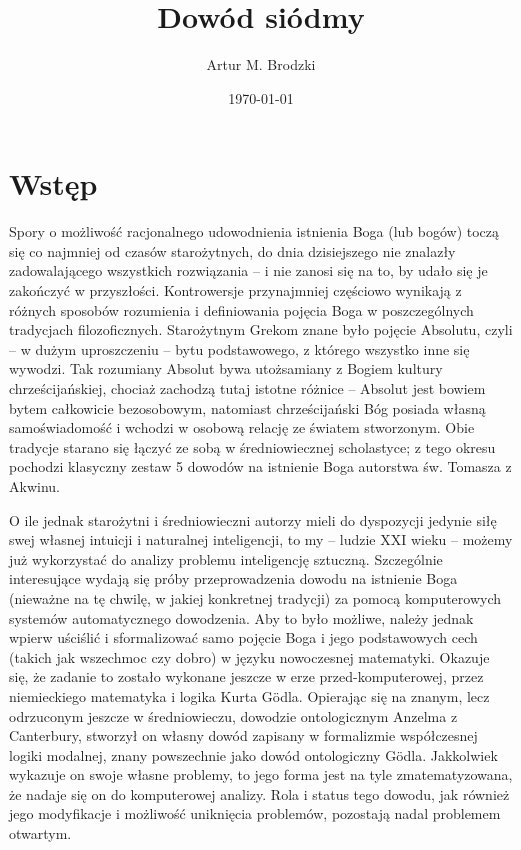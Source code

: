 \documentclass{eiti-raport}
\begin{document}
\author{Artur M. Brodzki}
\date{\today}
\subject{SDM2}
\title{
	Dowód siódmy
}
\maketitle


\section{Wstęp} \label{sec:intro}
Spory o możliwość racjonalnego udowodnienia istnienia Boga (lub bogów) toczą się co najmniej od czasów starożytnych, do dnia dzisiejszego nie znalazły zadowalającego wszystkich rozwiązania -- i nie zanosi się na to, by udało się je zakończyć w przyszłości. Kontrowersje przynajmniej częściowo wynikają z różnych sposobów rozumienia i definiowania pojęcia Boga w poszczególnych tradycjach filozoficznych. Starożytnym Grekom znane było pojęcie Absolutu, czyli -- w dużym uproszczeniu -- bytu podstawowego, z którego wszystko inne się wywodzi. Tak rozumiany Absolut bywa utożsamiany z Bogiem kultury chrześcijańskiej, chociaż zachodzą tutaj istotne różnice -- Absolut jest bowiem bytem całkowicie bezosobowym, natomiast chrześcijański Bóg posiada własną samoświadomość i wchodzi w osobową relację ze światem stworzonym. Obie tradycje starano się łączyć ze sobą w średniowiecznej scholastyce; z tego okresu pochodzi klasyczny zestaw 5 dowodów na istnienie Boga autorstwa św. Tomasza z Akwinu. 

O ile jednak starożytni i średniowieczni autorzy mieli do dyspozycji jedynie siłę swej własnej intuicji i naturalnej inteligencji, to my -- ludzie XXI wieku -- możemy już wykorzystać do analizy problemu inteligencję sztuczną. Szczególnie interesujące wydają się próby przeprowadzenia dowodu na istnienie Boga (nieważne na tę chwilę, w jakiej konkretnej tradycji) za pomocą komputerowych systemów automatycznego dowodzenia. Aby to było możliwe, należy jednak wpierw uściślić i sformalizować samo pojęcie Boga i jego podstawowych cech (takich jak wszechmoc czy dobro) w języku nowoczesnej matematyki. Okazuje się, że zadanie to zostało wykonane jeszcze w erze przed-komputerowej, przez niemieckiego matematyka i logika Kurta G\"odla. Opierając się na znanym, lecz odrzuconym jeszcze w średniowieczu, dowodzie ontologicznym Anzelma z Canterbury, stworzył on własny dowód zapisany w formalizmie współczesnej logiki modalnej, znany powszechnie jako dowód ontologiczny G\"odla. Jakkolwiek wykazuje on swoje własne problemy, to jego forma jest na tyle zmatematyzowana, że nadaje się on do komputerowej analizy. Rola i status tego dowodu, jak również jego modyfikacje i możliwość uniknięcia problemów, pozostają nadal problemem otwartym. 
\end{document}
